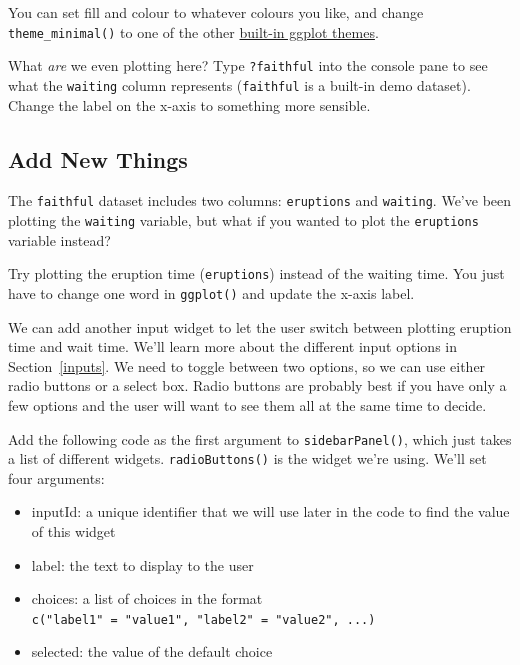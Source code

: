 \documentclass[
  oneside]{book}
\newcommand{\AttributeTok}[1]{\textcolor[rgb]{0.77,0.63,0.00}{#1}}
\providecommand{\tightlist}{%
  \setlength{\itemsep}{0pt}\setlength{\parskip}{0pt}}
\begin{document}
\begin{info}
You can set \AttributeTok{fill} and \AttributeTok{colour} to whatever colours you like, and change \texttt{theme\_minimal}\texttt{()} to one of the other \href{https://ggplot2.tidyverse.org/reference/ggtheme.html\#examples}{built-in ggplot themes}.

\end{info}

\begin{try}
What \emph{are} we even plotting here? Type \texttt{?faithful} into the console pane to see what the \texttt{waiting} column represents (\texttt{faithful} is a built-in demo dataset). Change the label on the x-axis to something more sensible.

\end{try}

\hypertarget{add-new-things}{%
\subsection{Add New Things}\label{add-new-things}}

The \texttt{faithful} dataset includes two columns: \texttt{eruptions} and \texttt{waiting}. We've been plotting the \texttt{waiting} variable, but what if you wanted to plot the \texttt{eruptions} variable instead?

\begin{try}
Try plotting the eruption time (\texttt{eruptions}) instead of the waiting time. You just have to change one word in \texttt{ggplot}\texttt{()} and update the x-axis label.

\end{try}

We can add another input widget to let the user switch between plotting eruption time and wait time. We'll learn more about the different input options in Section~\ref{inputs}. We need to toggle between two options, so we can use either radio buttons or a select box. Radio buttons are probably best if you have only a few options and the user will want to see them all at the same time to decide.

Add the following code as the first argument to \texttt{sidebarPanel}\texttt{()}, which just takes a list of different widgets. \texttt{radioButtons}\texttt{()} is the widget we're using. We'll set four arguments:

\begin{itemize}
\tightlist
\item
  \AttributeTok{inputId}: a unique identifier that we will use later in the code to find the value of this widget
\item
  \AttributeTok{label}: the text to display to the user
\item
  \AttributeTok{choices}: a list of choices in the format \texttt{c("label1"\ =\ "value1",\ "label2"\ =\ "value2",\ ...)}
\item
  \AttributeTok{selected}: the value of the default choice
\end{itemize}
\end{document}
